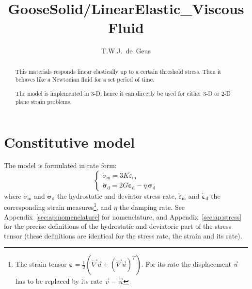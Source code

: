 \documentclass[times,namecite]{goose-article}
\title{%
  GooseSolid/LinearElastic\_ViscousFluid
}
\author{T.W.J.~de~Geus}
\begin{document}
\maketitle

\begin{abstract}
This materials responds linear elastically up to a certain threshold stress. Then it behaves like a Newtonian fluid for a set period of time.

The model is implemented in 3-D, hence it can directly be used for either 3-D or 2-D plane strain problems.
\end{abstract}


\setcounter{tocdepth}{2}
\tableofcontents

\vfill\newpage
\section{Constitutive model}

The model is formulated in rate form:
\begin{equation}
\begin{cases}
\dot{\sigma}_\mathrm{m} = 3 K \dot{\varepsilon}_\mathrm{m} \\
\dot{\bm{\sigma}}_\mathrm{d} = 2 G \dot{\bm{\varepsilon}}_\mathrm{d} - \eta \, \bm{\sigma}_\mathrm{d}
\end{cases}
\end{equation}
where $\dot{\sigma}_\mathrm{m}$ and $\dot{\bm{\sigma}}_\mathrm{d}$ the hydrostatic and deviator stress rate, $\dot{\varepsilon}_\mathrm{m}$ and $\dot{\bm{\varepsilon}}_\mathrm{d}$ the corresponding strain measures\footnote{The strain tensor $\bm{\varepsilon} = \tfrac{1}{2} \left( \vec{\nabla} \vec{u} + (\vec{\nabla} \vec{u})^T \right)$. For its rate the displacement $\vec{u}$ has to be replaced by its rate $\vec{v} = \dot{\vec{u}}$}, and $\eta$ the damping rate. See Appendix~\ref{sec:ap:nomenclature} for nomenclature, and Appendix~\ref{sec:ap:stress} for the precise definitions of the hydrostatic and deviatoric part of the stress tensor (these definitions are identical for the stress rate, the strain and its rate).
\end{document}
